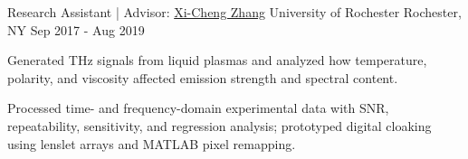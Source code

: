 \begin{cventries}
  \cventry
    {Research Assistant | Advisor: \href{https://labsites.rochester.edu/zhang/}{Xi-Cheng Zhang}}
    {University of Rochester}
    {Rochester, NY}
    {Sep 2017 - Aug 2019}
    {
      \begin{cvitems}
        \item {Generated THz signals from liquid plasmas and analyzed how temperature, polarity, and viscosity affected emission strength and spectral content.}
        \item {Processed time- and frequency-domain experimental data with SNR, repeatability, sensitivity, and regression analysis; prototyped digital cloaking using lenslet arrays and MATLAB pixel remapping.}
      \end{cvitems}
    }

\end{cventries}
